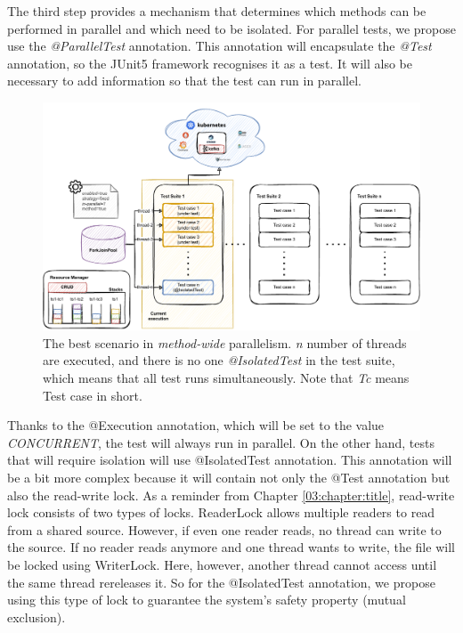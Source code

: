 The third step provides a mechanism that determines which methods can be performed in parallel and which need to be isolated.
For parallel tests, we propose use the \emph{@ParallelTest} annotation.
This annotation will encapsulate the \emph{@Test} annotation, so the JUnit5 framework recognises it as a test.
It will also be necessary to add information so that the test can run in parallel.
\begin{figure}[!ht]
    \centering
    \includegraphics[scale=0.8]{obrazky-figures/06-proposal-of-parallel-approach/04-method-wide}
    \caption{The best scenario in \emph{method-wide} parallelism. \emph{n} number of threads are executed, and there is no one \emph{@IsolatedTest} in the test suite, which means that all test runs simultaneously. Note that \emph{Tc} means Test case in short.}
    \label{05:fig:methodwideparallelism}
\end{figure}
Thanks to the @Execution annotation, which will be set to the value \emph{CONCURRENT}, the test will always run in parallel.
On the other hand, tests that will require isolation will use @IsolatedTest annotation.
This annotation will be a bit more complex because it will contain not only the @Test annotation but also the read-write lock.
As a reminder from Chapter \ref{03:chapter:title}, read-write lock consists of two types of locks.
ReaderLock allows multiple readers to read from a shared source.
However, if even one reader reads, no thread can write to the source.
If no reader reads anymore and one thread wants to write, the file will be locked using WriterLock.
Here, however, another thread cannot access until the same thread rereleases it.
So for the @IsolatedTest annotation, we propose using this type of lock to guarantee the system's safety property (mutual exclusion).

